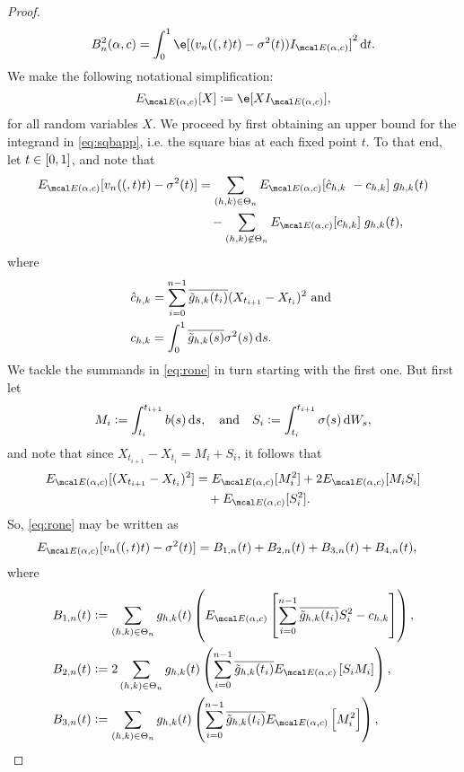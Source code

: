 \begin{appendices}
\begin{proof}
\begin{align}
  B^2_n(\alpha, c) = \int_0^1 \e[ (\svn(t) - \sigma^2(t))\indvol]^2 \D t. \label{eq:sqbapp}
\end{align}
We make the following notational simplification:
\begin{align}
  \eind [ X] := \e[ X \indvol], \notag
  \label{}
\end{align}
for all random variables $X$. We proceed by first obtaining an  upper bound  for the integrand in \eqref{eq:sqbapp}, i.e. the square bias at each fixed point $t$. To that end, let $t \in [0,1]$, and note that 
\begin{align}
  \eind[ \svn(t) - \sigma^2(t)] & = \sum_{(h,k) \in \Theta_n} \eind[\cnhk\ - \chk]\;g_{h,k}(t)\notag\\
  & \quad -\sum_{(h,k) \not\in \Theta_n} \eind[\chk]\;g_{h,k}(t),\label{eq:rone} 
\end{align}
  where 
\begin{align}  
  \cnhk &= \sum_{i =0}^{n-1} \btghki (X_{t_{i+1}} - X_{t_i})^2 \text{ and }\notag\\  
  \chk &= \int^1_0 \btghks \sigma^2(s) \D s. \notag
\end{align}
We tackle the summands in \eqref{eq:rone} in turn starting with the first one. But first let 
\begin{align}
  M_i := \int_{t_i}^{t_{i+1}} b(s) \D s, \quad \text{and} \quad  S_i := \int_{t_i}^{t_{i+1}} \sigma(s) \D W_s, \notag
\end{align}
and note that since $X_{t_{i+1}} - X_{t_i} = M_i + S_i$, it follows that
\begin{align}
  \eind[(X_{t_{i+1}} - X_{t_i})^2] &= \eind[M_i^2]  
  + 2\eind[M_iS_i] \notag\\ & \quad+ \eind[S_i^2].\notag 
\end{align}
So, \eqref{eq:rone} may be written as 
\begin{align}
  &\eind[\svn(t) - \sv(t)] = B_{1,n}(t) + B_{2,n}(t) + B_{3,n}(t) + B_{4,n}(t), \notag
\end{align}
where
\begin{align}
  &B_{1,n}(t) :=  \sumt g_{h,k}(t) \left(\eind\left[ \sum_{i=0}^{n-1} \btghki S_i^2  - \chk\right]\right), \notag\\
  &B_{2,n}(t) := 2 \sumt g_{h,k}(t)\left(\sum_{i=0}^{n-1} \btghki \eind\left[S_i M_i\right] \right), \notag\\
  &B_{3,n}(t) := \sumt g_{h,k}(t)\left( \sum_{i=0}^{n-1} \btghki \eind\left[M_i^2\right] \right), \notag\\

\end{align}
\end{proof}
\end{appendices}

